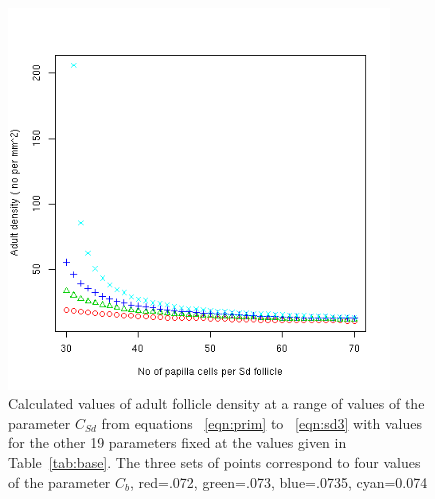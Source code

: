 %

\begin{figure}[!h]
  \centering
   \includegraphics[width=0.9\textwidth]{sdavecellnodens2.png}
  \caption{Calculated values of adult follicle density at a range of values of the parameter $C_{Sd}$  from equations ~\ref{eqn:prim} to ~\ref{eqn:sd3} with values for the other 19  parameters fixed at the values given in Table~\ref{tab:base}. The three sets of points correspond to four values of the parameter $C_{b}$, red=.072, green=.073, blue=.0735, cyan=0.074}
  \label{fig:sdavecellnodens2}
\end{figure}

%

